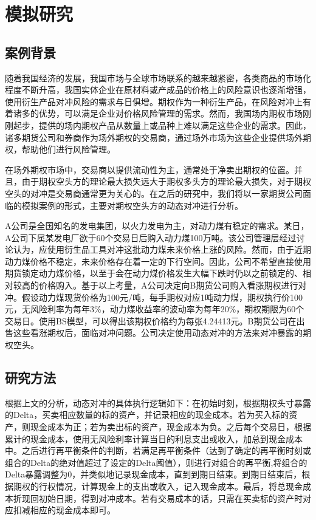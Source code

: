 
\chapter{模拟研究}
\label{chap:analysis}

\section{案例背景}

随着我国经济的发展，我国市场与全球市场联系的越来越紧密，各类商品的市场化程度不断升高，我国实体企业在原材料或产成品的价格上的风险意识也逐渐增强，使用衍生产品对冲风险的需求与日俱增。期权作为一种衍生产品，在风险对冲上有着诸多的优势，可以满足企业对价格风险管理的需求。然而，我国场内期权市场刚刚起步，提供的场内期权产品从数量上或品种上难以满足这些企业的需求。因此，诸多期货公司和券商作为场外期权的交易商，通过场外市场为这些企业提供场外期权，帮助他们进行风险管理。

在场外期权市场中，交易商以提供流动性为主，通常处于净卖出期权的位置。并且，由于期权空头方的理论最大损失远大于期权多头方的理论最大损失，对于期权空头的对冲是交易商通常更为关心的。在之后的研究中，我们将以一家期货公司面临的模拟案例的形式，主要对期权空头方的动态对冲进行分析。

A公司是全国知名的发电集团，以火力发电为主，对动力煤有稳定的需求。某日，A公司下属某发电厂欲于60个交易日后购入动力煤100万吨。该公司管理层经过讨论认为，应使用衍生品工具对冲这批动力煤未来价格上涨的风险。然而，由于近期动力煤价格不稳定，未来价格存在着一定的下行空间。因此，公司不希望直接使用期货锁定动力煤价格，以至于会在动力煤价格发生大幅下跌时仍以之前锁定的、相对较高的价格购入。基于以上考量，A公司决定向B期货公司购入看涨期权进行对冲。假设动力煤现货价格为100元/吨，每手期权对应1吨动力煤，期权执行价100元，无风险利率为每年3\%，动力煤收益率的波动率为每年20\%，期权期限为60个交易日。使用BS模型，可以得出该期权价格约为每张4.24413元。B期货公司在出售这些看涨期权后，面临对冲问题。公司决定使用动态对冲的方法来对冲暴露的期权空头。

\section{研究方法}

根据上文的分析，动态对冲的具体执行逻辑如下：在初始时刻，根据期权头寸暴露的Delta，买卖相应数量的标的资产，并记录相应的现金成本。若为买入标的资产，则现金成本为正；若为卖出标的资产，现金成本为负。之后每个交易日，根据累计的现金成本，使用无风险利率计算当日的利息支出或收入，加总到现金成本中。之后进行再平衡条件的判断，若满足再平衡条件（达到了确定的再平衡时刻或组合的Delta的绝对值超过了设定的Delta阈值），则进行对组合的再平衡,将组合的Delta暴露调整为0，并类似地记录现金成本，直到到期日结束。到期日结束后，根据期权的行权情况，计算现金上的支出或收入，记入现金成本。最后，将总现金成本折现回初始日期，得到对冲成本。若有交易成本的话，只需在买卖标的资产时对应扣减相应的现金成本即可。

